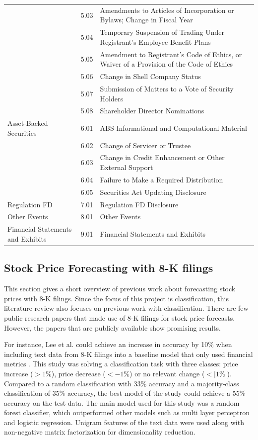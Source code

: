 \documentclass{article}
\begin{document}
\begin{table}[h!]
\begin{tabularx}{\textwidth}{|X|l|X|}
		& 5.03 & Amendments to Articles of Incorporation or Bylaws; Change in Fiscal Year \\
		& 5.04 & Temporary Suspension of Trading Under Registrant's Employee Benefit Plans \\
		& 5.05 & Amendment to Registrant's Code of Ethics, or Waiver of a Provision of the Code of Ethics \\
		& 5.06 & Change in Shell Company Status \\
		& 5.07 & Submission of Matters to a Vote of Security Holders \\
		& 5.08 & Shareholder Director Nominations \\
		Asset-Backed Securities & 6.01 & ABS Informational and Computational Material \\
		& 6.02 & Change of Servicer or Trustee \\
		& 6.03 & Change in Credit Enhancement or Other External Support \\
		& 6.04 & Failure to Make a Required Distribution \\
		& 6.05 & Securities Act Updating Disclosure \\
		Regulation FD & 7.01 & Regulation FD Disclosure \\
		Other Events & 8.01 & Other Events \\
		Financial Statements and Exhibits & 9.01 & Financial Statements and Exhibits \\
		\bottomrule
	\end{tabularx}

	\end{table}%

	\subsection{Stock Price Forecasting with 8-K filings}
	
	This section gives a short overview of previous work about forecasting stock prices with 8-K filings. Since the focus of this project is classification, this literature review also focuses on previous work with classification. There are few public research papers that made use of 8-K filings for stock price forecasts. However, the papers that are publicly available show promising results. 
	
	For instance, Lee et al. could achieve an increase in accuracy by 10\% when including text data from 8-K filings into a baseline model that only used financial metrics \cite{lee_importance_2014}. This study was solving a classification task with three classes: price increase ($> 1\%$), price decrease ($< -1\%$) or no relevant change ($< |1 \%|$). Compared to a random classification with 33\% accuracy and a majority-class classification of 35\% accuracy, the best model of the study could achieve a 55\% accuracy on the test data. The main model used for this study was a random forest classifier, which outperformed other models such as multi layer perceptron and logistic regression. Unigram features of the text data were used along with non-negative matrix factorization for dimensionality reduction.
	
\end{document}
